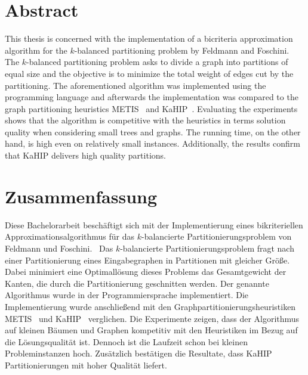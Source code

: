 \chapter{Abstract}
This thesis is concerned with the implementation of a bicriteria approximation algorithm for the $k$\hyp balanced partitioning problem by Feldmann and Foschini.~\cite{FF15}
The $k$\hyp balanced partitioning problem asks to divide a graph into partitions of equal size and the objective is to minimize the total weight of edges cut by the partitioning.
The aforementioned algorithm was implemented using the programming language \Cpp{} and afterwards the implementation was compared to the graph partitioning heuristics METIS~\cite{KK98} and KaHIP~\cite{SS13}.
Evaluating the experiments shows that the algorithm is competitive with the heuristics in terms solution quality when considering small trees and graphs.
The running time, on the other hand, is high even on relatively small instances.
Additionally, the results confirm that KaHIP delivers high quality partitions.

{\let\cleardoublepage\relax \chapter{Zusammenfassung}}
Diese Bachelorarbeit beschäftigt sich mit der Implementierung eines bikriteriellen Approximationsalgorithmus für das $k$\hyp balancierte Partitionierungsproblem von Feldmann und Foschini.~\cite{FF15}
Das $k$\hyp balancierte Partitionierungsproblem fragt nach einer Partitionierung eines Eingabegraphen in Partitionen mit gleicher Größe.
Dabei minimiert eine Optimallösung dieses Problems das Gesamtgewicht der Kanten, die durch die Partitionierung geschnitten werden.
Der genannte Algorithmus wurde in der Programmiersprache \Cpp{} implementiert.
Die Implementierung wurde anschließend mit den Graphpartitionierungsheuristiken METIS~\cite{KK98} und KaHIP~\cite{SS13} verglichen.
Die Experimente zeigen, dass der Algorithmus auf kleinen Bäumen und Graphen kompetitiv mit den Heuristiken im Bezug auf die Lösungsqualität ist.
Dennoch ist die Laufzeit schon bei kleinen Probleminstanzen hoch.
Zusätzlich bestätigen die Resultate, dass KaHIP Partitionierungen mit hoher Qualität liefert.
